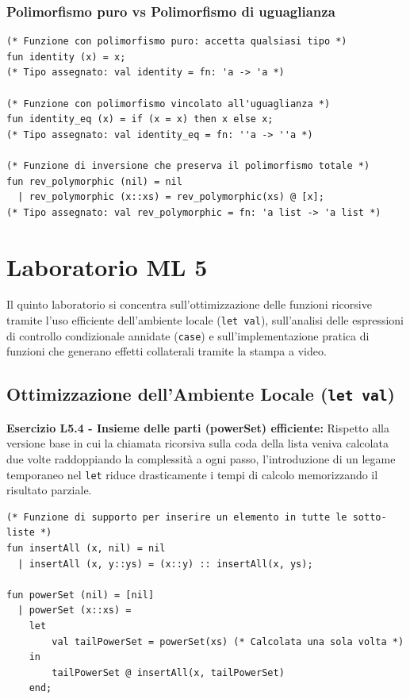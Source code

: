 \documentclass[12pt, a4paper]{article}
\begin{document}
\subsubsection{Polimorfismo puro vs Polimorfismo di uguaglianza}
\begin{verbatim}
(* Funzione con polimorfismo puro: accetta qualsiasi tipo *)
fun identity (x) = x;
(* Tipo assegnato: val identity = fn: 'a -> 'a *)

(* Funzione con polimorfismo vincolato all'uguaglianza *)
fun identity_eq (x) = if (x = x) then x else x;
(* Tipo assegnato: val identity_eq = fn: ''a -> ''a *)

(* Funzione di inversione che preserva il polimorfismo totale *)
fun rev_polymorphic (nil) = nil
  | rev_polymorphic (x::xs) = rev_polymorphic(xs) @ [x];
(* Tipo assegnato: val rev_polymorphic = fn: 'a list -> 'a list *)
\end{verbatim}

\section{Laboratorio ML 5}

Il quinto laboratorio si concentra sull'ottimizzazione delle funzioni ricorsive tramite l'uso efficiente dell'ambiente locale (\texttt{let val}), sull'analisi delle espressioni di controllo condizionale annidate (\texttt{case}) e sull'implementazione pratica di funzioni che generano effetti collaterali tramite la stampa a video.

\subsection{Ottimizzazione dell'Ambiente Locale (\texttt{let val})}

\textbf{Esercizio L5.4 - Insieme delle parti (powerSet) efficiente:}
Rispetto alla versione base in cui la chiamata ricorsiva sulla coda della lista veniva calcolata due volte raddoppiando la complessità a ogni passo, l'introduzione di un legame temporaneo nel \texttt{let} riduce drasticamente i tempi di calcolo memorizzando il risultato parziale.
\begin{verbatim}
(* Funzione di supporto per inserire un elemento in tutte le sotto-liste *)
fun insertAll (x, nil) = nil
  | insertAll (x, y::ys) = (x::y) :: insertAll(x, ys);

fun powerSet (nil) = [nil]
  | powerSet (x::xs) =
    let
        val tailPowerSet = powerSet(xs) (* Calcolata una sola volta *)
    in
        tailPowerSet @ insertAll(x, tailPowerSet)
    end;
\end{verbatim}
\end{document}

